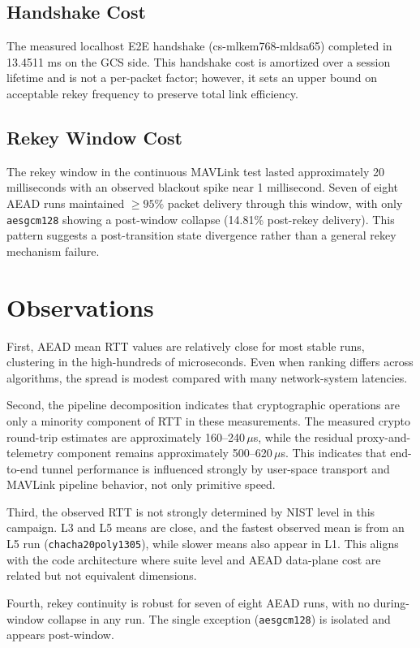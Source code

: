 \documentclass[conference]{IEEEtran}
\begin{document}
\subsection{Handshake Cost}
The measured localhost E2E handshake (cs-mlkem768-mldsa65) completed in 13.4511 ms on the GCS side. This handshake cost is amortized over a session lifetime and is not a per-packet factor; however, it sets an upper bound on acceptable rekey frequency to preserve total link efficiency.
\subsection{Rekey Window Cost}
The rekey window in the continuous MAVLink test lasted approximately 20 milliseconds with an observed blackout spike near 1 millisecond. Seven of eight AEAD runs maintained $\geq 95\%$ packet delivery through this window, with only \texttt{aesgcm128} showing a post-window collapse (14.81\% post-rekey delivery). This pattern suggests a post-transition state divergence rather than a general rekey mechanism failure.
\section{Observations}

First, AEAD mean RTT values are relatively close for most stable runs, clustering in the high-hundreds of microseconds. Even when ranking differs across algorithms, the spread is modest compared with many network-system latencies.

Second, the pipeline decomposition indicates that cryptographic operations are only a minority component of RTT in these measurements. The measured crypto round-trip estimates are approximately 160--240\,$\mu$s, while the residual proxy-and-telemetry component remains approximately 500--620\,$\mu$s. This indicates that end-to-end tunnel performance is influenced strongly by user-space transport and MAVLink pipeline behavior, not only primitive speed.

Third, the observed RTT is not strongly determined by NIST level in this campaign. L3 and L5 means are close, and the fastest observed mean is from an L5 run (\texttt{chacha20poly1305}), while slower means also appear in L1. This aligns with the code architecture where suite level and AEAD data-plane cost are related but not equivalent dimensions.

Fourth, rekey continuity is robust for seven of eight AEAD runs, with no during-window collapse in any run. The single exception (\texttt{aesgcm128}) is isolated and appears post-window.
\end{document}
